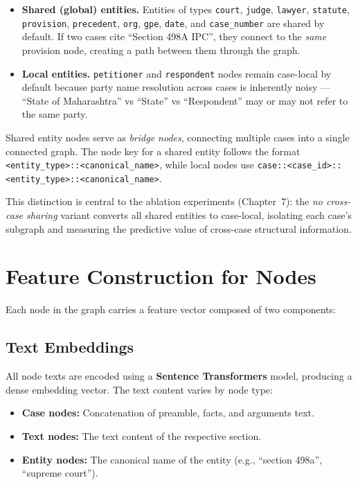 \begin{itemize}
    \item \textbf{Shared (global) entities.} Entities of types \texttt{court}, \texttt{judge}, \texttt{lawyer}, \texttt{statute}, \texttt{provision}, \texttt{precedent}, \texttt{org}, \texttt{gpe}, \texttt{date}, and \texttt{case\_number} are shared by default. If two cases cite ``Section 498A IPC'', they connect to the \emph{same} provision node, creating a path between them through the graph.
    \item \textbf{Local entities.} \texttt{petitioner} and \texttt{respondent} nodes remain case-local by default because party name resolution across cases is inherently noisy — ``State of Maharashtra'' vs ``State'' vs ``Respondent'' may or may not refer to the same party.
\end{itemize}

Shared entity nodes serve as \emph{bridge nodes}, connecting multiple cases into a single connected graph. The node key for a shared entity follows the format \texttt{<entity\_type>::<canonical\_name>}, while local nodes use \texttt{case::<case\_id>::<entity\_type>::<canonical\_name>}.

This distinction is central to the ablation experiments (Chapter~7): the \emph{no cross-case sharing} variant converts all shared entities to case-local, isolating each case's subgraph and measuring the predictive value of cross-case structural information.

\section{Feature Construction for Nodes}
\label{sec:features}

Each node in the graph carries a feature vector composed of two components:

\subsection{Text Embeddings}

All node texts are encoded using a \textbf{Sentence Transformers} model, producing a dense embedding vector. The text content varies by node type:

\begin{itemize}
    \item \textbf{Case nodes:} Concatenation of preamble, facts, and arguments text.
    \item \textbf{Text nodes:} The text content of the respective section.
    \item \textbf{Entity nodes:} The canonical name of the entity (e.g., ``section 498a'', ``supreme court'').
\end{itemize}


